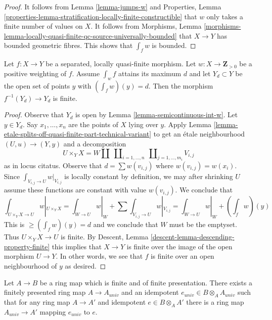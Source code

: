 \begin{proof}
It follows from Lemma \ref{lemma-jumps-w} and
Properties, Lemma
\ref{properties-lemma-stratification-locally-finite-constructible}
that $w$ only takes a finite number of values on $X$.
It follows from Morphisms, Lemma
\ref{morphisms-lemma-locally-quasi-finite-qc-source-universally-bounded}
that $X \to Y$ has bounded geometric fibres.
This shows that $\int_f w$ is bounded.
\end{proof}

\begin{lemma}
\label{lemma-max-int-finite}
Let $f : X \to Y$ be a separated, locally quasi-finite morphism.
Let $w : X \to \mathbf{Z}_{> 0}$ be a positive weighting of $f$.
Assume $\int_w f$ attains its maximum $d$ and let $Y_d \subset Y$
be the open set of points $y$ with $(\int_f w)(y) = d$. Then
the morphism $f^{-1}(Y_d) \to Y_d$ is finite.
\end{lemma}

\begin{proof}
Observe that $Y_d$ is open by Lemma \ref{lemma-semicontinuous-int-w}.
Let $y \in Y_d$. Say $x_1, \ldots, x_n$ are the points of $X$
lying over $y$. Apply
Lemma \ref{lemma-etale-splits-off-quasi-finite-part-technical-variant}
to get an \'etale neighbourhood $(U, u) \to (Y, y)$ and a decomposition
$$
U \times_Y X =
W \amalg
\ \coprod\nolimits_{i = 1, \ldots, n}
\ \coprod\nolimits_{j = 1, \ldots, m_i}
V_{i, j}
$$
as in locus citatus. Observe that $d = \sum w(v_{i, j})$ where
$w(v_{i, j}) = w(x_i)$. Since $\int_{V_{i, j} \to U} w|_{V_{i, j}}$
is locally constant by definition, we may after shrinking $U$
assume these functions are constant with value $w(v_{i, j})$.
We conclude that
$$
\textstyle{\int}_{U \times_Y X \to U} w|_{U \times_Y X} =
\textstyle{\int}_{W \to U} w|_W +
\sum \textstyle{\int}_{V_{i, j} \to U} w|_{V_{i, j}} =
\textstyle{\int}_{W \to U} w|_W + (\int_f w)(y)
$$
This is $\geq (\int_f w)(y) = d$ and we conclude that $W$
must be the emptyset. Thus $U \times_Y X \to U$ is finite.
By Descent, Lemma \ref{descent-lemma-descending-property-finite}
this implies that $X \to Y$ is finite over
the image of the open morphism $U \to Y$. In other words,
we see that $f$ is finite over an open neighbourhood of $y$
as desired.
\end{proof}

\begin{lemma}
\label{lemma-open-and-closed-in-finite}
Let $A \to B$ be a ring map which is finite and of finite presentation.
There exists a finitely presented ring map $A \to A_{univ}$
and an idempotent $e_{univ} \in B \otimes_A A_{univ}$
such that for any ring map $A \to A'$ and idempotent $e \in B \otimes_A A'$
there is a ring map $A_{univ} \to A'$ mapping $e_{univ}$ to $e$.
\end{lemma}

